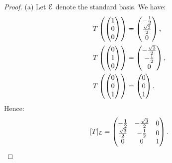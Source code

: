 \documentclass[10pt,twoside,openany]{memoir}
\begin{document}
    {\color{blue} \begin{proof}
        (a) Let $\mathcal{E}$ denote the standard basis. We have:
            \begin{equation*}
            \begin{split}
                T \left( \left( \begin{matrix} 1 \\ 0 \\ 0 \end{matrix} \right) \right) & = \left( \begin{matrix} -\frac{1}{2} \\ \frac{\sqrt{3}}{2} \\ 0 \end{matrix} \right), \\
                T \left( \left( \begin{matrix} 0 \\ 1 \\ 0 \end{matrix} \right) \right) & =\left( \begin{matrix} -\frac{\sqrt{3}}{2} \\ -\frac{1}{2} \\ 0 \end{matrix} \right), \\
                T \left( \left( \begin{matrix} 0 \\ 0 \\ 1 \end{matrix} \right) \right) & = \left( \begin{matrix} 0 \\ 0 \\ 1 \end{matrix} \right). 
            \end{split}
            \end{equation*}
        Hence:
            \begin{equation*}
            \begin{split}
                [T]_{\mathcal{E}} = \left( \begin{matrix} 
                -\frac{1}{2} & -\frac{\sqrt{3}}{2} & 0 \\ 
                \frac{\sqrt{3}}{2} & -\frac{1}{2} & 0 \\ 
                0 & 0 & 1 
                \end{matrix} \right).
            \end{split}
            \end{equation*}


\end{proof}}
\end{document}
